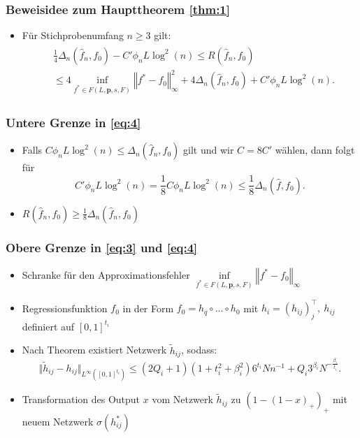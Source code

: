 \documentclass[hyperref={pdfpagelabels=false}]{beamer}
\begin{document}
\begin{frame}
\frametitle{Beweisidee zum Haupttheorem \ref{thm:1}}
\begin{itemize}
\item Für Stichprobenumfang $n \geq 3$ gilt:
\begin{align} \label{eq:5} 
\begin{split}
& \frac{1}{4} \Delta _n (\widehat{f}_n, f_0) - C' \phi_n L \log^2(n) \leq R(\widehat{f}_n , f_0) \\
& \leq 4 \inf\limits_{f^* \in F(L,\mathbf{p},s, F)} \left\Vert f^* - f_0 \right\Vert ^2 _\infty + 4\Delta_n(\widehat{f}_n , f_0) + C'\phi_n L \log^2(n).
\end{split} 
\end{align}
\end{itemize}
\end{frame}


\begin{frame}
\frametitle{Untere Grenze in \eqref{eq:4}}
\begin{itemize}
\item Falls $C \phi _n L \log^2(n) \leq \Delta _n (\widehat{f}_n,f_0)$ gilt und wir $ C= 8C'$ wählen, dann folgt für 
\begin{equation*}
C' \phi_n L \log^2(n) = \frac{1}{8} C \phi_n L \log^2(n) \leq \frac{1}{8}\Delta_n(\widehat{f}, f_0).
\end{equation*}
\item $R(\widehat{f}_n, f_0) \geq \frac{1}{8}\Delta_n(\widehat{f}_n, f_0)$
\end{itemize}
\end{frame}

\begin{frame}
\frametitle{Obere Grenze in \eqref{eq:3} und \eqref{eq:4}}
\begin{itemize}
\item Schranke für den Approximationsfehler $
\inf\limits_{f^* \in F(L,\mathbf{p},s, F)} \left\Vert f^* - f_0 \right\Vert_\infty$
\item Regressionsfunktion $f_0$ in der Form $f_0 = h_q \circ ... \circ h_0 $ mit $h_i =(h_{ij})_j ^\top, \ h_{ij}$ definiert auf $[0,1]^{t_i}$
\item Nach Theorem existiert Netzwerk $\widetilde{h}_{ij}$, sodass:\begin{equation} \label{eq:6}
\Vert \widetilde{h}_{ij} - h_{ij} \Vert _{L^\infty ([0,1]^{t_i} )} \leq (2Q_i +1 )(1+t_i^2+ \beta_i^2) 6^{t_i} N n^{-1} + Q_i 3^{\beta_i} N ^{- \frac{\beta_i}{t_i}}.
\end{equation}
\item Transformation des Output $x$ vom Netzwerk $\widetilde{h}_{ij}$ zu $(1-(1-x)_+)_+$ mit neuem Netzwerk $\sigma (h^*_{ij})$
\end{itemize}
\end{frame}
\end{document}
